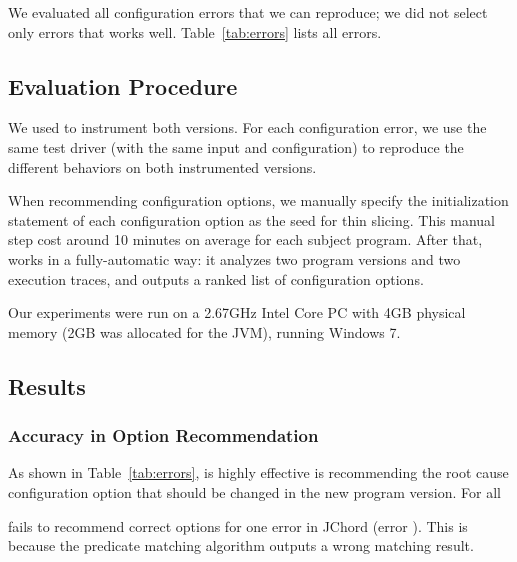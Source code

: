 We evaluated all configuration errors that we can reproduce;
we did not select only errors that \ourtool works well.
Table~\ref{tab:errors} lists all errors.

\subsection{Evaluation Procedure}

We used \ourtool to instrument both versions. 
For each configuration error, we use the same test driver
(with the same input and configuration)
to reproduce the different behaviors on both instrumented versions.

When recommending configuration options, we manually specify
the initialization statement of each configuration option as
the seed for thin slicing. This manual step cost around
10 minutes on average for each subject program. After that,
\ourtool works in a fully-automatic way: it 
analyzes two program versions and two execution traces,
and outputs a ranked list of configuration options.

Our experiments were run on a 2.67GHz Intel Core PC
with 4GB physical memory (2GB was allocated for the JVM),
running Windows 7.

\subsection{Results}

\subsubsection{Accuracy in Option Recommendation}
\label{sec:accuracy}

As shown in Table~\ref{tab:errors}, \ourtool is highly effective
is recommending the root cause configuration option that should
be changed in the new program version. For all 


\ourtool fails to recommend correct options for one error in
JChord (error ). This is because the predicate matching
algorithm outputs a wrong matching result.


\vspace{1mm}

